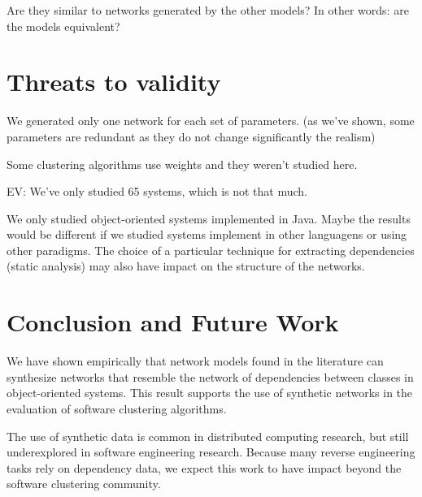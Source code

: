 Are they similar to networks generated by the other models? In other words: are
the models equivalent?

\section{Threats to validity}


%

We generated only one network for each set of parameters. (as we've shown, some
parameters are redundant as they do not change significantly the realism)

Some clustering algorithms use weights and they weren't studied here.

EV: We've only studied 65 systems, which is not that much.

We only studied object-oriented systems implemented in Java. Maybe the results
would be different if we studied systems implement in other languagens or using
other paradigms. The choice of a particular technique for extracting
dependencies (static analysis) may also have impact on the structure of the
networks.


\section{Conclusion and Future Work}

We have shown empirically that network models found in the literature can
synthesize networks that resemble the network of dependencies between classes in
object-oriented systems. This result supports the use of synthetic networks in
the evaluation of software clustering algorithms.

The use of synthetic data is common in distributed computing research, but still
underexplored in software engineering research. Because many reverse engineering
tasks rely on dependency data, we expect this work to have impact beyond the
software clustering community.

